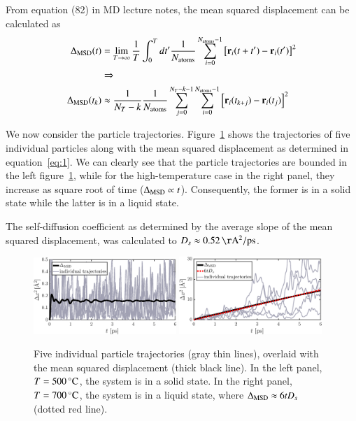 From equation (82) in MD lecture notes, the mean squared displacement can be calculated as
\begin{align}
\Delta_{\rm MSD}(t) &= \lim_{T \rightarrow \infty} \frac{1}{T} \int_0^{T} d t' \frac{1}{N_{\rm atoms}} \sum_{i=0}^{N_{\rm atoms}-1} \left[{\bf r}_i(t+t') - {\bf r}_i(t') \right]^2 \\ &\Rightarrow \nonumber
\\
\Delta_{\rm MSD}(t_k) &\approx
\frac{1}{N_T -k}\frac{1}{N_{\rm atoms}} \sum_{j=0}^{N_T-k-1} \sum_{i=0}^{N_{\rm atoms}-1} \left[{\bf r}_i(t_{k+j}) - {\bf r}_i(t_j) \right]^2 
\label{eq:1}
\end{align}

We now consider the particle trajectories. Figure~\ref{fig:MSD} shows the trajectories of five individual particles along with the mean squared displacement as determined in equation~\eqref{eq:1}. We can clearly see that the particle trajectories are bounded in the left figure~\ref{fig:MSD}, while for the high-temperature case in the right panel, they increase as square root of time ($\Delta_{\rm MSD} \propto t$). Consequently, the former is in a solid state while the latter is in a liquid state. 

The self-diffusion coefficient as determined by the average slope of the mean squared displacement, was calculated to $D_s \approx \unit[0.52]{\AA^2/ps}$.  

\begin{figure}[!ht]
\begin{center}
  \includegraphics[width=0.48\textwidth]{../figures/MSD-500} 
    \includegraphics[width=0.48\textwidth]{../figures/MSD-700} 
  \caption{Five individual particle trajectories (gray thin lines), overlaid with the mean squared displacement (thick black line). In the left panel, $T=\unit[500]{^\circ C}$, the system is in a solid state. In the right panel, $T=\unit[700]{^\circ C}$, the system is in a liquid state, where $\Delta_{\rm MSD} \approx 6 t D_s$ (dotted red line).}
  \label{fig:MSD}
\end{center}
\end{figure}

